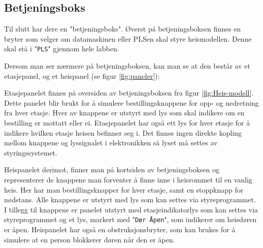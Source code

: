 \begin{alphasection}
\subsection{Betjeningsboks}
Til slutt har dere en "betjeningsboks". Øverst på betjeningsboksen finnes en bryter som velger om datamaskinen eller PLSen skal styre heismodellen. Denne skal stå i "\verb|PLS|" gjennom hele labben.



Dersom man ser nærmere på betjeningsboksen, kan man se at den består av et etasjepanel, og et heispanel (se figur \ref{fig:paneler}):

Etasjepanelet finnes på oversiden av betjeningsboksen fra figur \ref{fig:Heis-modell}. Dette panelet blir brukt for å simulere bestillingsknappene for opp- og nedretning fra hver etasje.  Hver av knappene er utstyrt med lys som skal indikere om en bestilling er mottatt eller ei. Etasjepanelet har også ett lys for hver etasje for å indikere hvilken etasje heisen befinner seg i. Det finnes ingen direkte kopling mellom knappene og lyssignalet i elektronikken så lyset må settes av styringssystemet.

Heispanelet derimot, finner man på kortsiden av betjeningsboksen og representerer de knappene man forventer å finne inne i heisrommet til en vanlig heis. Her har man bestillingsknapper for hver etasje, samt en stoppknapp for nødstans. Alle knappene er utstyrt med lys som kan settes via styreprogrammet. I tillegg til knappene er panelet utstyrt med etasjeindikatorlys som kan settes via styreprogrammet og et lys, markert med "\verb|Dør Åpen|", som indikerer om heisdøren er åpen. Heispanelet har også en obstruksjonsbryter, som kan brukes for å simulere at en person blokkerer døren når den er åpen.
\begin{figure}[ht!]
    \centering

\end{figure}
\end{alphasection}
